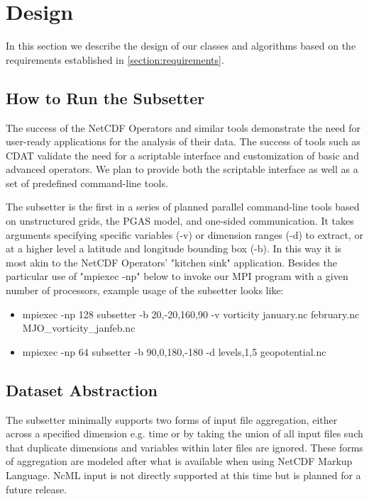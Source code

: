 \section{Design}
\label{section:design}

In this section we describe the design of our classes and algorithms based on
the requirements established in \ref{section:requirements}.

\subsection{How to Run the Subsetter}

The success of the NetCDF Operators\cite{NCO} and similar tools demonstrate
the need for user-ready applications for the analysis of their data.  The
success of tools such as CDAT\cite{CDAT} validate the need for a scriptable
interface and customization of basic and advanced operators.  We plan to
provide both the scriptable interface as well as a set of predefined
command-line tools.

The subsetter is the first in a series of planned parallel command-line tools
based on unstructured grids, the PGAS model, and one-sided communication.  It
takes arguments specifying specific variables (-v) or dimension ranges (-d) to
extract, or at a higher level a latitude and longitude bounding box (-b).  In
this way it is most akin to the NetCDF Operators' "kitchen sink" application.
Besides the particular use of "mpiexec -np" below to invoke our MPI program
with a given number of processors, example usage of the subsetter looks like:

\begin{itemize}
\item mpiexec -np 128 subsetter -b 20,-20,160,90 -v vorticity january.nc february.nc MJO\_vorticity\_janfeb.nc
\item mpiexec -np 64 subsetter -b 90,0,180,-180 -d levels,1,5 geopotential.nc
\end{itemize}

\subsection{Dataset Abstraction}

The subsetter minimally supports two forms of input file aggregation, either
across a specified dimension e.g. time or by taking the union of all input
files such that duplicate dimensions and variables within later files are
ignored.  These forms of aggregation are modeled after what is available when
using NetCDF Markup Language\cite{NcML}.  NcML input is not directly supported
at this time but is planned for a future release. 

